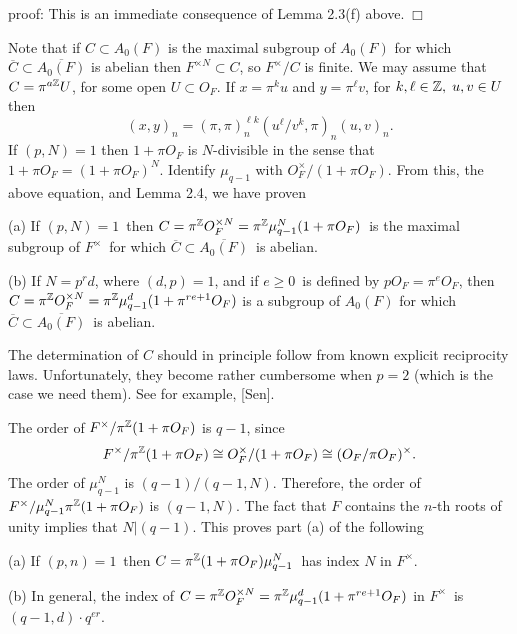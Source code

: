 {\sf proof}: This is an immediate consequence of Lemma 2.3(f) above.$\;\Box $

Note that if $C\subset A_0(F)$ is the maximal subgroup of $A_0(F)$ for which 
$\overline{C}\subset \overline{A_0(F)}$ is abelian then $F^{\times N}\subset
C$, so $F^{\times }/C$ is finite. We may assume that $C=\pi ^{a{\Bbb Z}}U$,
for some open $U\subset O_F$. If $x=\pi ^ku$ and $y=\pi ^\ell v$, for $%
k,\ell \in {\Bbb Z},\;u,v\in U$ then 
\begin{equation}
(x,y)_n=(\pi ,\pi )_n^{\ell k}(u^\ell /v^k,\pi )_n(u,v)_n.
\end{equation}
If $(p,N)=1$ then $1+\pi O_F$ is $N$-divisible in the sense that $1+\pi
O_F=(1+\pi O_F)^N$. Identify $\mu _{q-1}$ with $O_F^{\times }/(1+\pi O_F)$.
From this, the above equation, and Lemma 2.4, we have proven

\begin{lemma}
(a) If $(p,N)=1$\ then $C=\pi ^{{\Bbb Z}}O_F^{\times N}=\pi ^{{\Bbb Z}}\mu
_{q-1}^N(1+\pi O_F)$\ is the maximal subgroup of $F^{\times }$\ for which $%
\overline{C}\subset \overline{A_0(F)}$\ is abelian.

(b) If $N=p^rd$, where $(d,p)=1$, and if $e\geq 0$\ is defined by $pO_F=\pi
^eO_F$, then $C=\pi ^{{\Bbb Z}}O_F^{\times N}=\pi ^{{\Bbb Z}}\mu
_{q-1}^d(1+\pi ^{re+1}O_F)$ is a subgroup of $A_0(F)$ for which $\overline{C}%
\subset \overline{A_0(F)}$\ is abelian.
\end{lemma}

\begin{remark}
The determination of $C$ should in principle follow from known explicit
reciprocity laws. Unfortunately, they become rather cumbersome when $p=2$
(which is the case we need them). See for example, [Sen].
\end{remark}

The order of $F^{\times }/\pi ^{{\Bbb Z}}(1+\pi O_F)$ is $q-1$, since 
\begin{equation}
F^{\times }/\pi ^{{\Bbb Z}}(1+\pi O_F)\cong O_F^{\times }/(1+\pi O_F)\cong
(O_F/\pi O_F)^{\times }.
\end{equation}
The order of $\mu _{q-1}^N$ is $(q-1)/(q-1,N)$. Therefore, the order of $%
F^{\times }/\mu _{q-1}^N\pi ^{{\Bbb Z}}(1+\pi O_F)$ is $(q-1,N)$. The fact
that $F$ contains the $n$-th roots of unity implies that $N|(q-1)$. This
proves part (a) of the following

\begin{lemma}
(a) If $(p,n)=1$\ then $C=\pi ^{{\Bbb Z}}(1+\pi O_F)\mu _{q-1}^N$\ has index 
$N$ in $F^{\times }$.

(b) In general, the index of $C=\pi ^{{\Bbb Z}}O_F^{\times N}=\pi ^{{\Bbb Z}%
}\mu _{q-1}^d(1+\pi ^{re+1}O_F)$ in $F^{\times }$\ is $(q-1,d)\cdot q^{er}$.
\end{lemma}

